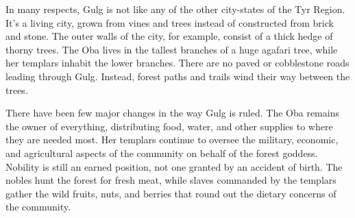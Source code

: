 {
	In many respects, Gulg is not like any of the other city-states of the Tyr Region. It's a living city, grown from vines and trees instead of constructed from brick and stone. The outer walls of the city, for example, consist of a thick hedge of thorny trees. The Oba lives in the tallest branches of a huge agafari tree, while her templars inhabit the lower branches. There are no paved or cobblestone roads leading through Gulg. Instead, forest paths and trails wind their way between the trees.

	There have been few major changes in the way Gulg is ruled. The Oba remains the owner of everything, distributing food, water, and other supplies to where they are needed most. Her templars continue to oversee the military, economic, and agricultural aspects of the community on behalf of the forest goddess. Nobility is still an earned position, not one granted by an accident of birth. The nobles hunt the forest for fresh meat, while slaves commanded by the templars gather the wild fruits, nuts, and berries that round out the dietary concerns of the community.
}
